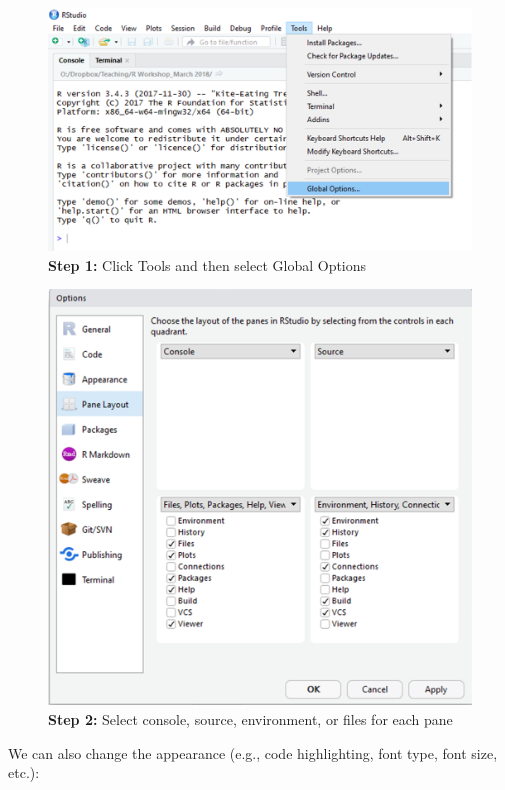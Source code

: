\documentclass[]{book}
\begin{document}
\begin{figure}
\centering
\includegraphics{figure/img2.png}
\caption{\textbf{Step 1:} Click Tools and then select Global Options}
\end{figure}

\begin{figure}
\centering
\includegraphics{figure/img3.png}
\caption{\textbf{Step 2:} Select console, source, environment, or files for each pane}
\end{figure}

We can also change the appearance (e.g., code highlighting, font type, font size, etc.):
\end{document}
